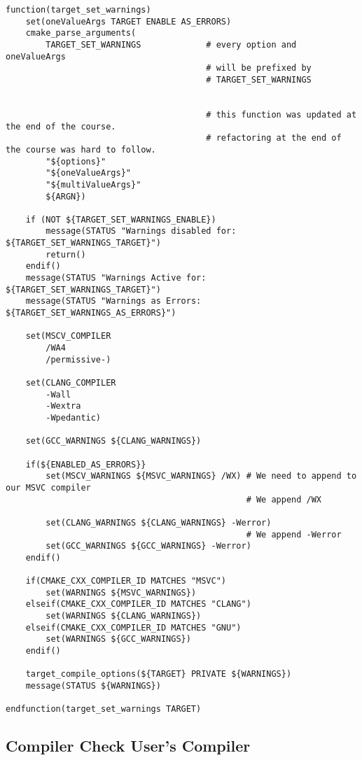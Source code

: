 \documentclass[openany]{report}
\begin{document}
\begin{verbatim}
function(target_set_warnings)
    set(oneValueArgs TARGET ENABLE AS_ERRORS)
    cmake_parse_arguments(
        TARGET_SET_WARNINGS             # every option and oneValueArgs
                                        # will be prefixed by
                                        # TARGET_SET_WARNINGS


                                        # this function was updated at the end of the course.
                                        # refactoring at the end of the course was hard to follow.
        "${options}"
        "${oneValueArgs}"
        "${multiValueArgs}"
        ${ARGN})

    if (NOT ${TARGET_SET_WARNINGS_ENABLE})
        message(STATUS "Warnings disabled for: ${TARGET_SET_WARNINGS_TARGET}")
        return()
    endif()
    message(STATUS "Warnings Active for: ${TARGET_SET_WARNINGS_TARGET}")
    message(STATUS "Warnings as Errors: ${TARGET_SET_WARNINGS_AS_ERRORS}")

    set(MSCV_COMPILER
        /WA4
        /permissive-)

    set(CLANG_COMPILER
        -Wall
        -Wextra
        -Wpedantic)

    set(GCC_WARNINGS ${CLANG_WARNINGS})

    if(${ENABLED_AS_ERRORS}}
        set(MSCV_WARNINGS ${MSVC_WARNINGS} /WX) # We need to append to our MSVC compiler
                                                # We append /WX

        set(CLANG_WARNINGS ${CLANG_WARNINGS} -Werror)
                                                # We append -Werror
        set(GCC_WARNINGS ${GCC_WARNINGS} -Werror)
    endif()

    if(CMAKE_CXX_COMPILER_ID MATCHES "MSVC")
        set(WARNINGS ${MSVC_WARNINGS})
    elseif(CMAKE_CXX_COMPILER_ID MATCHES "CLANG")
        set(WARNINGS ${CLANG_WARNINGS})
    elseif(CMAKE_CXX_COMPILER_ID MATCHES "GNU")
        set(WARNINGS ${GCC_WARNINGS})
    endif()

    target_compile_options(${TARGET} PRIVATE ${WARNINGS})
    message(STATUS ${WARNINGS})

endfunction(target_set_warnings TARGET)
\end{verbatim}

\subsection{Compiler Check User's Compiler}
\end{document}
